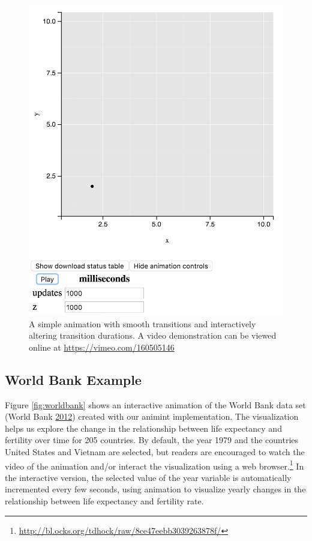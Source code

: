\documentclass[12pt,]{isuthesis}
\let\rmarkdownfootnote\footnote%
\def\footnote{\protect\rmarkdownfootnote}
\begin{document}
\begin{figure}[htbp]
\centering
\includegraphics{images/animation}
\caption{\label{fig:animation}A simple animation with smooth transitions and
interactively altering transition durations. A video demonstration can
be viewed online at \url{https://vimeo.com/160505146}}
\end{figure}

\subsection{World Bank Example}
\label{sec:worldbank}

Figure \ref{fig:worldbank} shows an interactive animation of the World
Bank data set (World Bank \protect\hyperlink{ref-WorldBank}{2012})
created with our animint implementation. The visualization helps us
explore the change in the relationship between life expectancy and
fertility over time for 205 countries. By default, the year 1979 and the
countries United States and Vietnam are selected, but readers are
encouraged to watch the video of the animation and/or interact the
visualization using a web
browser.\footnote{\url{http://bl.ocks.org/tdhock/raw/8ce47eebb3039263878f/}}
In the interactive version, the selected value of the year variable is
automatically incremented every few seconds, using animation to
visualize yearly changes in the relationship between life expectancy and
fertility rate.
\end{document}
